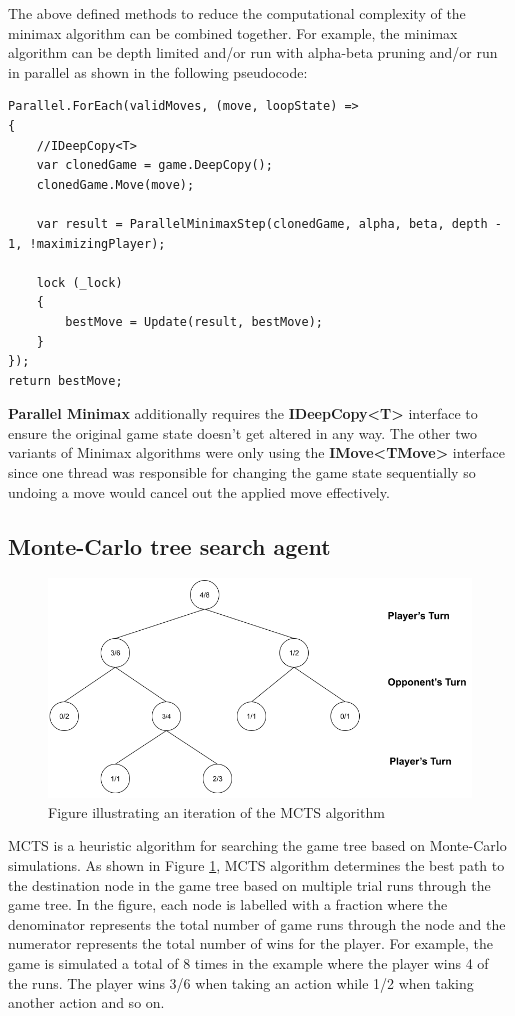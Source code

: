 The above defined methods to reduce the computational complexity of the minimax algorithm can be combined together. For example, the minimax algorithm can be depth limited and/or run with alpha-beta pruning and/or run in parallel as shown in the following pseudocode:

\begin{lstlisting}
Parallel.ForEach(validMoves, (move, loopState) =>
{
    //IDeepCopy<T>
    var clonedGame = game.DeepCopy();
    clonedGame.Move(move);

    var result = ParallelMinimaxStep(clonedGame, alpha, beta, depth - 1, !maximizingPlayer);

    lock (_lock)
    {
        bestMove = Update(result, bestMove);
    }
});
return bestMove;
\end{lstlisting}


\textbf{Parallel Minimax} additionally requires the \textbf{IDeepCopy\textless{}T\textgreater{}} interface to ensure the original game state doesn't get altered in any way. The other two variants of Minimax algorithms were only using the  \textbf{IMove\textless{}TMove\textgreater{}} interface since one thread was responsible for changing the game state sequentially so undoing a move would cancel out the applied move effectively.

\subsection{Monte-Carlo tree search agent}

\begin{figure}[!ht]
    \centering
    \includegraphics[width = \linewidth]{../img/MCTS1.png}
    \caption{Figure illustrating an iteration of the MCTS algorithm}
    \label{fig:MCTS1}
\end{figure}

\ac{MCTS} is a heuristic algorithm for searching the game tree based on Monte-Carlo simulations. As shown in Figure \ref{fig:MCTS1}, \gls{MCTS} algorithm determines the best path to the destination node in the game tree based on multiple trial runs through the game tree. In the figure, each node is labelled with a fraction where the denominator represents the total number of game runs through the node and the numerator represents the total number of wins for the player. For example, the game is simulated a total of 8 times in the example where the player wins 4 of the runs. The player wins 3/6 when taking an action while 1/2 when taking another action and so on.

